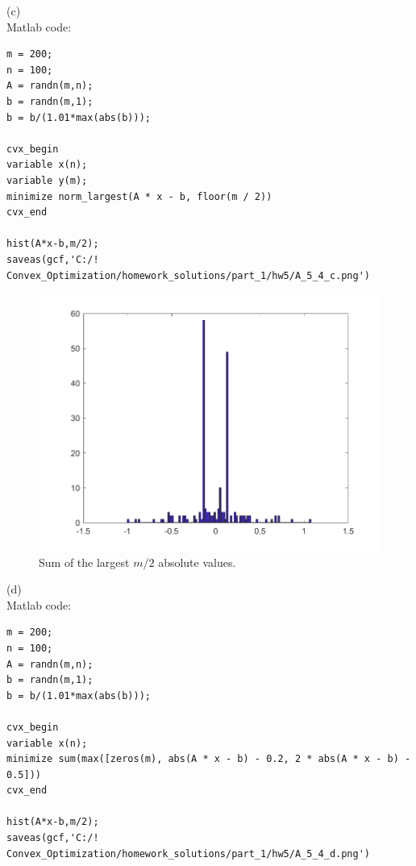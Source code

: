 \documentclass{article}
\begin{document}
(c)\\
Matlab code:

\begin{verbatim}
m = 200;
n = 100;
A = randn(m,n);
b = randn(m,1);
b = b/(1.01*max(abs(b)));

cvx_begin
variable x(n);
variable y(m);
minimize norm_largest(A * x - b, floor(m / 2))
cvx_end

hist(A*x-b,m/2);
saveas(gcf,'C:/! Convex_Optimization/homework_solutions/part_1/hw5/A_5_4_c.png')
\end{verbatim}

\begin{figure}[H]
	\includegraphics[width=\linewidth]{A_5_4_c.png}
	\caption{Sum of the largest $m/2$ absolute values.}
\end{figure}


(d)\\
Matlab code:

\begin{verbatim}
m = 200;
n = 100;
A = randn(m,n);
b = randn(m,1);
b = b/(1.01*max(abs(b)));

cvx_begin
variable x(n);
minimize sum(max([zeros(m), abs(A * x - b) - 0.2, 2 * abs(A * x - b) - 0.5]))
cvx_end

hist(A*x-b,m/2);
saveas(gcf,'C:/! Convex_Optimization/homework_solutions/part_1/hw5/A_5_4_d.png')
\end{verbatim}
\end{document}

